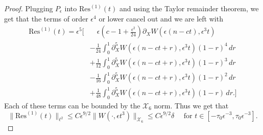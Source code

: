 \begin{proof}
	Plugging \(P_\epsilon\) into \(\mathrm{Res}^{(1)}(t)\) and using the Taylor remainder theorem, we get that the terms of order \(\epsilon^4\) or lower cancel out and we are left with
	\begin{equation}
		\begin{aligned}
			\mathrm{Res}^{(1)}(t) = \epsilon^5 \Biggl[ &\quad\epsilon\left(c-1+\frac{\epsilon^2}{24}\right) \partial_X W(\epsilon(n-ct),\epsilon^3 t)\\
			&-\frac 1 {24} \int_0^1 \partial_X^5 W(\epsilon(n-ct+r), \epsilon^3 t)(1-r)^4 \, dr  \\ 
			&+ \frac 1 {12}  \int_0^1 \partial_X^5 W(\epsilon(n-ct+r), \epsilon^3 t)(1-r)^3 \, dr \\
			&- \frac 1 {16}  \int_0^1 \partial_X^5 W(\epsilon(n-ct+r), \epsilon^3 t)(1-r)^2 \, dr \\
			&+ \frac 1 {48}  \int_0^1 \partial_X^5 W(\epsilon(n-ct+r), \epsilon^3 t)(1-r) \, dr. \Biggr]
		\end{aligned}
	\end{equation}
	Each of these terms can be bounded by the \(\mathcal X_6\) norm. Thus we get that
	\begin{equation}
		\| \mathrm{Res}^{(1)}(t) \|_{\ell^2}  \leq C \epsilon^{9/2} \| W(\cdot, \epsilon t^3)\|_{\mathcal X_6} \leq C \epsilon^{9/2} \delta \quad \text{ for } t\in [-\tau_0\epsilon^{-3}, \tau_0\epsilon^{-3}].
	\end{equation}
	

\end{proof}
